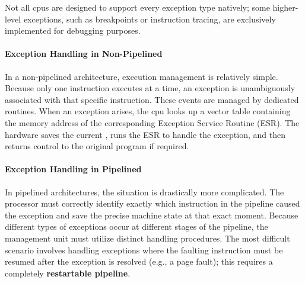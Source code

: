 \noindent Not all \glspl{cpu} are designed to support every exception type natively; some higher-level exceptions, such as breakpoints or instruction tracing, are exclusively implemented for debugging purposes.

\paragraph{Exception Handling in Non-Pipelined } 
In a non-pipelined architecture, execution management is relatively simple. Because only one instruction executes at a time, an exception is unambiguously associated with that specific instruction. These events are managed by dedicated routines. When an exception arises, the \gls{cpu} looks up a vector table containing the memory address of the corresponding Exception Service Routine (ESR). The hardware saves the current , runs the ESR to handle the exception, and then returns control to the original program if required.

\paragraph{Exception Handling in Pipelined } 
In pipelined architectures, the situation is drastically more complicated. The processor must correctly identify exactly which instruction in the pipeline caused the exception and save the precise machine state at that exact moment. Because different types of exceptions occur at different stages of the pipeline, the management unit must utilize distinct handling procedures. The most difficult scenario involves handling exceptions where the faulting instruction must be resumed after the exception is resolved (e.g., a page fault); this requires a completely \textbf{restartable pipeline}.

